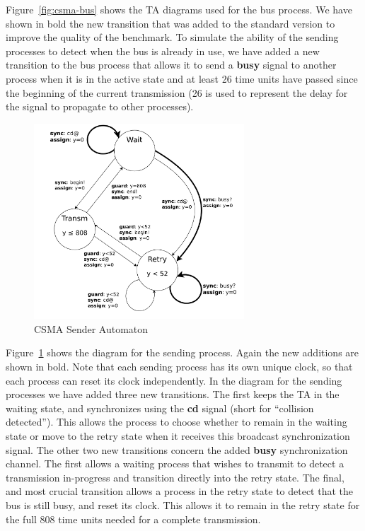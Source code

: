 \documentclass[a4paper,11pt]{report}
\theoremstyle{definition}
\begin{document}
Figure~\ref{fig:csma-bus} shows the TA diagrams used for the bus process. We have shown in
bold the new transition that was added to the standard version to improve the
quality of the benchmark. To simulate the ability of the sending processes to
detect when the bus is already in use, we have added a new transition to the bus
process that allows it to send a \textbf{busy} signal to another process when it
is in the active state and at least 26 time units have passed since the
beginning of the current transmission (26 is used to represent the delay for the
signal to propagate to other processes).

\begin{figure}[h]
  \centering
  \includegraphics[width=0.7\textwidth]{csma-sender}
  \caption{CSMA Sender Automaton}
  \label{fig:csma-sender}
\end{figure}

Figure~\ref{fig:csma-sender} shows the diagram for the sending process. Again
the new additions are shown in bold. Note that each sending process has its own
unique clock, so that each process can reset its clock independently. In the
diagram for the sending processes we have added three new transitions. The first
keeps the TA in the waiting state, and synchronizes using the \textbf{cd} signal
(short for ``collision detected''). This allows the process to choose whether to
remain in the waiting state or move to the retry state when it receives this
broadcast synchronization signal. The other two new transitions concern the
added \textbf{busy} synchronization channel. The first allows a waiting process
that wishes to transmit to detect a transmission in-progress and transition
directly into the retry state. The final, and most crucial transition allows a
process in the retry state to detect that the bus is still busy, and reset its
clock. This allows it to remain in the retry state for the full 808 time units
needed for a complete transmission.
\end{document}
